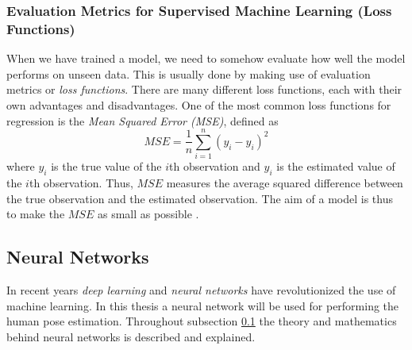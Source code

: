 \documentclass[./main.tex]{subfiles}
\begin{document}
\subsubsection{Evaluation Metrics for Supervised Machine Learning (Loss Functions)}
When we have trained a model, we need to somehow evaluate how well the model performs on unseen data. This is usually done by making use of evaluation metrics or \textit{loss functions}. There are many different loss functions, each with their own advantages and disadvantages. One of the most common loss functions for regression is the \textit{Mean Squared Error (MSE)}, defined as
$$MSE = \frac{1}{n} \sum_{i = 1} ^n \left( y_i - \hat{y}_i \right)^2$$
where $y_i$ is the true value of the $i$th observation and $\hat{y}_i$ is the estimated value of the $i$th observation. Thus, $MSE$ measures the average squared difference between the true observation and the estimated observation. The aim of a model is thus to make the $MSE$ as small as possible \cite{ISL}.

\subsection{Neural Networks} \label{subsec:NeuralNetworks}
In recent years \textit{deep learning} and \textit{neural networks} have revolutionized the use of machine learning. In this thesis a neural network will be used for performing the human pose estimation. Throughout subsection \ref{subsec:NeuralNetworks} the theory and mathematics behind neural networks is described and explained.
\end{document}
